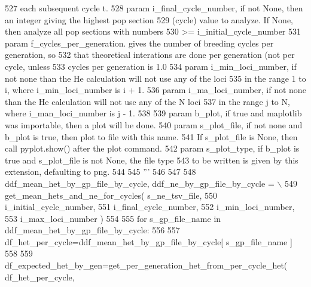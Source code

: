 \begin{DoxyCode}
527 \textcolor{stringliteral}{        each subsequent cycle t.}
528 \textcolor{stringliteral}{    param i\_final\_cycle\_number, if not None, then an integer giving the highest pop section}
529 \textcolor{stringliteral}{        (cycle) value to analyze.  If None, then analyze all pop sections with numbers }
530 \textcolor{stringliteral}{        >= i\_initial\_cycle\_number}
531 \textcolor{stringliteral}{    param f\_cycles\_per\_generation.  gives the number of breeding cycles per generation, so}
532 \textcolor{stringliteral}{        that theoretical interations are done per generation (not per cycle, unless }
533 \textcolor{stringliteral}{        cycles per generation is 1.0}
534 \textcolor{stringliteral}{    param i\_min\_loci\_number, if not none than the He calculation will not use any of the loci}
535 \textcolor{stringliteral}{            in the range 1 to i, where i\_min\_loci\_number is i + 1.}
536 \textcolor{stringliteral}{    param i\_ma\_loci\_number, if not none than the He calculation will not use any of the N loci}
537 \textcolor{stringliteral}{            in the range j to N, where i\_man\_loci\_number is j - 1.}
538 \textcolor{stringliteral}{}
539 \textcolor{stringliteral}{    param b\_plot, if true and maplotlib was importable, then a plot will be done.}
540 \textcolor{stringliteral}{    param s\_plot\_file, if not none and b\_plot is true, then plot to file with this name.}
541 \textcolor{stringliteral}{            If s\_plot\_file is None, then call pyplot.show() after the plot command.}
542 \textcolor{stringliteral}{    param s\_plot\_type, if b\_plot is true and s\_plot\_file is not None, the file type}
543 \textcolor{stringliteral}{            to be written is given by this extension, defaulting to png.}
544 \textcolor{stringliteral}{}
545 \textcolor{stringliteral}{    '''}
546     
547 
548     ddf\_mean\_het\_by\_gp\_file\_by\_cycle, ddf\_ne\_by\_gp\_file\_by\_cycle = \(\backslash\)
549             get\_mean\_hets\_and\_ne\_for\_cycles( s\_ne\_tsv\_file, 
550                                                 i\_initial\_cycle\_number,
551                                                 i\_final\_cycle\_number, 
552                                                 i\_min\_loci\_number, 
553                                                 i\_max\_loci\_number )
554 
555     \textcolor{keywordflow}{for} s\_gp\_file\_name \textcolor{keywordflow}{in} ddf\_mean\_het\_by\_gp\_file\_by\_cycle:
556 
557         df\_het\_per\_cycle=ddf\_mean\_het\_by\_gp\_file\_by\_cycle[ s\_gp\_file\_name ]
558 
559         df\_expected\_het\_by\_gen=get\_per\_generation\_het\_from\_per\_cycle\_het( df\_het\_per\_cycle, 

\end{DoxyCode}
